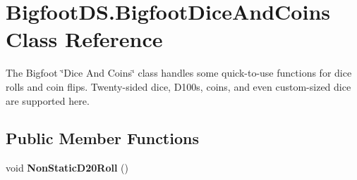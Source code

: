 \hypertarget{class_bigfoot_d_s_1_1_bigfoot_dice_and_coins}{}\section{Bigfoot\+D\+S.\+Bigfoot\+Dice\+And\+Coins Class Reference}
\label{class_bigfoot_d_s_1_1_bigfoot_dice_and_coins}


The Bigfoot \char`\"{}\+Dice And Coins\char`\"{} class handles some quick-\/to-\/use functions for dice rolls and coin flips. Twenty-\/sided dice, D100s, coins, and even custom-\/sized dice are supported here.  


\subsection*{Public Member Functions}
\begin{DoxyCompactItemize}
\item 
\mbox{\label{class_bigfoot_d_s_1_1_bigfoot_dice_and_coins_ac403a8693f203330cfd7a24aa16337cc}} 
void {\bfseries Non\+Static\+D20\+Roll} ()
\end{DoxyCompactItemize}
